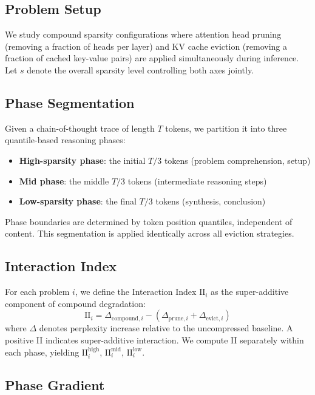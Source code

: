 \documentclass[11pt,a4paper]{article}
\begin{document}
\subsection{Problem Setup}

We study compound sparsity configurations where attention head pruning (removing a fraction of heads per layer) and KV cache eviction (removing a fraction of cached key-value pairs) are applied simultaneously during inference. Let $s$ denote the overall sparsity level controlling both axes jointly.

\subsection{Phase Segmentation}

Given a chain-of-thought trace of length $T$ tokens, we partition it into three quantile-based reasoning phases:
\begin{itemize}
    \item \textbf{High-sparsity phase}: the initial $T/3$ tokens (problem comprehension, setup)
    \item \textbf{Mid phase}: the middle $T/3$ tokens (intermediate reasoning steps)
    \item \textbf{Low-sparsity phase}: the final $T/3$ tokens (synthesis, conclusion)
\end{itemize}
Phase boundaries are determined by token position quantiles, independent of content. This segmentation is applied identically across all eviction strategies.

\subsection{Interaction Index}

For each problem $i$, we define the Interaction Index $\text{II}_i$ as the super-additive component of compound degradation:
\begin{equation}
    \text{II}_i = \Delta_{\text{compound},i} - (\Delta_{\text{prune},i} + \Delta_{\text{evict},i})
\end{equation}
where $\Delta$ denotes perplexity increase relative to the uncompressed baseline. A positive II indicates super-additive interaction. We compute II separately within each phase, yielding $\text{II}^{\text{high}}_i$, $\text{II}^{\text{mid}}_i$, $\text{II}^{\text{low}}_i$.

\subsection{Phase Gradient}
\end{document}
